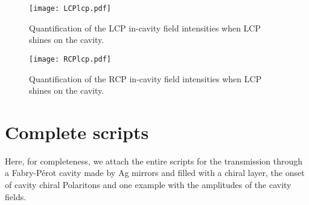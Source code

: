 \documentclass[aps,prl,10pt,onecolumn,superscriptaddress]{revtex4-2}
\begin{document}
\begin{figure}[H]
\begin{center}
\texttt{[image: LCPlcp.pdf]}
\end{center}
\caption{Quantification of the LCP in-cavity field intensities when LCP shines on the cavity.}
\label{LCPlcp}
\end{figure}
\begin{figure}[H]
\begin{center}
\texttt{[image: RCPlcp.pdf]}
\end{center}
\caption{Quantification of the RCP in-cavity field intensities when LCP shines on the cavity.}
\label{RCPlcp}
\end{figure}
\section{Complete scripts}
Here, for completeness, we attach the entire scripts for the transmission through a  Fabry-P\'erot cavity made by Ag mirrors and filled with a chiral layer, the onset of cavity chiral Polaritons and one example with the amplitudes of the cavity fields.
\end{document}
